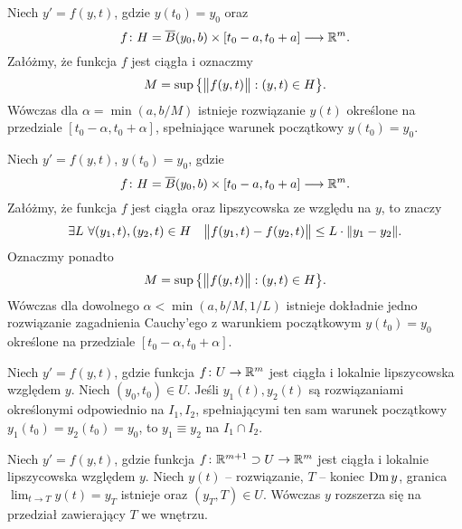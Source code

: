 %
\begin{theorem}[Peano]
  Niech $y' = f(y,t)$, gdzie $y(t_0) = y_0$ oraz
%
  \begin{equation*}
    f \colon H = \overline{B} (y_0, b) \times [t_0 - a, t_0 + a] \longrightarrow \R^m.
  \end{equation*}
%
  Załóżmy, że funkcja $f$ jest ciągła i oznaczmy
%
  \begin{equation*}
    M = \sup \big\{ \norm[\big]{f(y,t)} : (y, t) \in H \big\}.
  \end{equation*}
%
  Wówczas dla $\alpha = \min(a, b/M)$ istnieje rozwiązanie $y(t)$ określone na przedziale
  $[t_0 - \alpha, t_0 + \alpha]$, spełniające warunek początkowy $y(t_0) = y_0$.
\end{theorem}
%
\begin{theorem}
  Niech $y' = f(y,t)$, $y(t_0) = y_0$, gdzie
%
  \begin{equation*}
    f \colon H = \overline{B} (y_0, b) \times [t_0 - a, t_0 + a] \longrightarrow \R^m.
  \end{equation*}
%
  Załóżmy, że funkcja $f$ jest ciągła oraz lipszycowska ze względu na $y$, to znaczy
%
  \begin{equation*}
    \exists L \ \forall (y_1,t), (y_2,t) \in H \quad \norm[\big]{f(y_1,t) - f(y_2,t)} \leq L \cdot \norm{y_1 - y_2}.
  \end{equation*}
%
  Oznaczmy ponadto
%
  \begin{equation*}
    M = \sup \big\{ \norm[\big]{f(y,t)} : (y, t) \in H \big\}.
  \end{equation*}
%
  Wówczas dla dowolnego $\alpha < \min(a, b/M, 1/L)$ istnieje dokładnie jedno rozwiązanie zagadnienia Cauchy'ego z 
  warunkiem początkowym $y(t_0) = y_0$ określone na przedziale $[t_0 - \alpha, t_0 + \alpha]$.
\end{theorem}

\begin{lemma}
  Niech $y' = f(y,t)$, gdzie funkcja $f \colon U \to \R^m$ jest ciągła i lokalnie lipszycowska względem $y$. Niech 
  $(y_0,t_0) \in U$. Jeśli $y_1(t), y_2(t)$ są rozwiązaniami określonymi odpowiednio na $I_1, I_2$, spełniającymi ten 
  sam warunek początkowy $y_1(t_0) = y_2(t_0) = y_0$, to $y_1 \equiv y_2$ na $I_1 \cap I_2$.
\end{lemma}

\begin{lemma}
  Niech $y' = f(y,t)$, gdzie funkcja $f \colon \R^{m+1} \supset U \to \R^m$ jest ciągła i lokalnie lipszycowska 
  względem $y$. Niech $y(t)$ -- rozwiązanie, $T$ -- koniec $\domain y$, granica $\lim_{t \to T} y(t) = y_T$ istnieje 
  oraz $(y_T, T) \in U$. Wówczas $y$ rozszerza się na przedział zawierający $T$ we wnętrzu.
\end{lemma}

